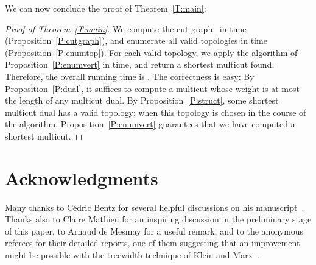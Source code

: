\documentclass[11pt]{article}
\theoremstyle{plain}  \newtheorem{theorem}{Theorem}[section]
\theoremstyle{definition}
\begin{document}
We can now conclude the proof of Theorem~\ref{T:main}:
\begin{proof}[Proof of Theorem~\ref{T:main}]
  We compute the cut graph~ in  time
  (Proposition~\ref{P:cutgraph}), and enumerate all valid topologies in
   time (Proposition~\ref{P:enumtop}).  For each valid
  topology, we apply the algorithm of Proposition~\ref{P:enumvert} in
   time, and return a shortest multicut
  found.  Therefore, the overall running time is
  .  The correctness is
  easy: By Proposition~\ref{P:dual}, it suffices to compute a multicut
  whose weight is at most the length of any multicut dual.  By
  Proposition~\ref{P:struct}, some shortest multicut dual has a valid
  topology; when this topology is chosen in the course of the algorithm,
  Proposition~\ref{P:enumvert} guarantees that we have computed a shortest
  multicut.
\end{proof}

\section*{Acknowledgments}

Many thanks to C\'edric Bentz for several helpful discussions on his
manuscript~\cite{b-ptapm-12}.  Thanks also to Claire Mathieu for an
inspiring discussion in the preliminary stage of this paper, to Arnaud de
Mesmay for a useful remark, and to the anonymous referees for their
detailed reports, one of them suggesting that an improvement might be
possible with the treewidth technique of Klein and Marx~\cite{km-spktc-12}.
\end{document}
